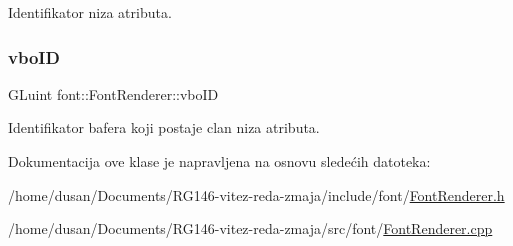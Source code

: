 Identifikator niza atributa. 

\mbox{\label{classfont_1_1FontRenderer_aea11a2460411cec768c047adc0e2615d}} 
\subsubsection{\texorpdfstring{vbo\+ID}{vboID}}
{\footnotesize\ttfamily G\+Luint font\+::\+Font\+Renderer\+::vbo\+ID\hspace{0.3cm}{\ttfamily [private]}}



Identifikator bafera koji postaje clan niza atributa. 



Dokumentacija ove klase je napravljena na osnovu sledećih datoteka\+:\begin{DoxyCompactItemize}
\item 
/home/dusan/\+Documents/\+R\+G146-\/vitez-\/reda-\/zmaja/include/font/\hyperlink{FontRenderer_8h}{Font\+Renderer.\+h}\item 
/home/dusan/\+Documents/\+R\+G146-\/vitez-\/reda-\/zmaja/src/font/\hyperlink{FontRenderer_8cpp}{Font\+Renderer.\+cpp}\end{DoxyCompactItemize}
